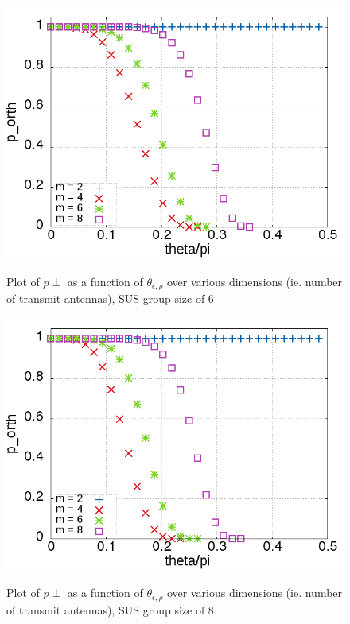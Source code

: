 \begin{figure}
    \includegraphics[width=12cm]{figs/p_orth_gs_6.png}\\
    \caption{Plot of $p{\perp}$ as a function of $\theta_{\epsilon,\rho}$ over various dimensions (ie. number of transmit antennas), SUS group size of 6}
    \label{fig:p_orth_gs_6}
\end{figure}

\begin{figure}
    \includegraphics[width=12cm]{figs/p_orth_gs_8.png}\\
    \caption{Plot of $p{\perp}$ as a function of $\theta_{\epsilon,\rho}$ over various dimensions (ie. number of transmit antennas), SUS group size of 8}
    \label{fig:p_orth_gs_8}
\end{figure}